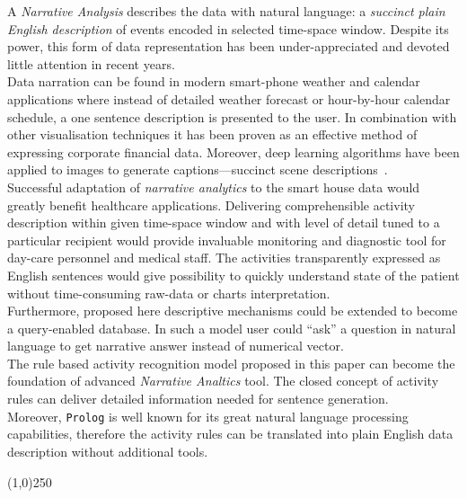 \documentclass[10pt, a4paper, pdflatex, leqno, twoside, openright]{report}
\begin{document}
A \emph{Narrative Analysis} describes the data with natural language: a \emph{succinct plain English description} of events encoded in selected time-space window. Despite its power, this form of data representation has been under-appreciated and devoted little attention in recent years.\\
Data narration can be found in modern smart-phone weather and calendar applications where instead of detailed weather forecast or hour-by-hour calendar schedule, a one sentence description is presented to the user. In combination with other visualisation techniques it has been proven as an effective method of expressing corporate financial data. Moreover, deep learning algorithms have been applied to images to generate captions---succinct scene descriptions~\citep{vinyals2014show}.\\

Successful adaptation of \emph{narrative analytics} to the smart house data would greatly benefit healthcare applications. Delivering comprehensible activity description within given time-space window and with level of detail tuned to a particular recipient would provide invaluable monitoring and diagnostic tool for day-care personnel and medical staff. The activities transparently expressed as English sentences would give possibility to quickly understand state of the patient without time-consuming raw-data or charts interpretation.\\
Furthermore, proposed here descriptive mechanisms could be extended to become a query-enabled database. In such a model user could ``ask'' a question in natural language to get narrative answer instead of numerical vector.\\

The rule based activity recognition model proposed in this paper can become the foundation of advanced \emph{Narrative Analtics} tool. The closed concept of activity rules can deliver detailed information needed for sentence generation.\\
Moreover, \texttt{Prolog} is well known for its great natural language processing capabilities, therefore the activity rules can be translated into plain English data description without additional tools.

\vfill
\begin{center}
\noindent \line(1,0){250}
\end{center}
\newpage
\thispagestyle{empty}%
\mbox{}

\cleardoublepage
{}
  {}
  
\cleardoublepage
{}
\end{document}
